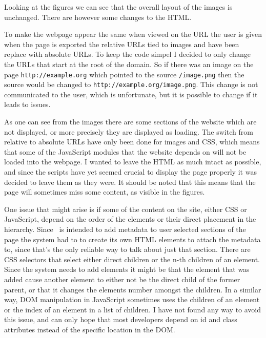 
Looking at the figures we can see that the overall layout of the images is unchanged.
There are however some changes to the HTML.

To make the webpage appear the same when viewed on the URL the user is given when the page is exported
the relative URLs tied to images and  have been replace with absolute URLs.
To keep the code simpel I decided to only change the URLs that start at the root of the domain.
So if there was an image on the page \texttt{http://example.org} which pointed to the source \texttt{/image.png}
then the source would be changed to \texttt{http://example.org/image.png}.
This change is not communicated to the user, which is unfortunate,
but it is possible to change if it leads to issues.

As one can see from the images there are some sections of the website which are not displayed, or more precisely they
are displayed as loading.
The switch from relative to absolute URLs have only been done for images and CSS,
which means that some of the JavaScript modules that the website depends on will not be loaded into the webpage.
I wanted to leave the HTML as much intact as possible,
and since the scripts have yet seemed crucial to display the page properly it was decided to leave them as they were.
It should be noted that this means that the page will sometimes miss some content, as visible in the figures.

One issue that might arise is if some of the content on the site, either CSS or JavaScript,
depend on the order of the elements or their direct placement in the hierarchy.
Since \theartefact\ is intended to add metadata to user selected sections of the page the system had to  to create its own
HTML elements to attach the metadata to, since that's the only reliable way to talk about just that section.
There are CSS selectors that select either direct children or the n-th children of an element.
Since the system needs to add elements it might be that the element that was added cause another element to either not be the direct
child of the former parent, or that it changes the elements number amongst the children.
In a similar way, DOM manipulation in JavaScript sometimes uses the children of an element or the index of an element
in a list of children.
I have not found any way to avoid this issue,
and can only hope that most developers depend on id and class attributes instead of the specific location in the DOM.

